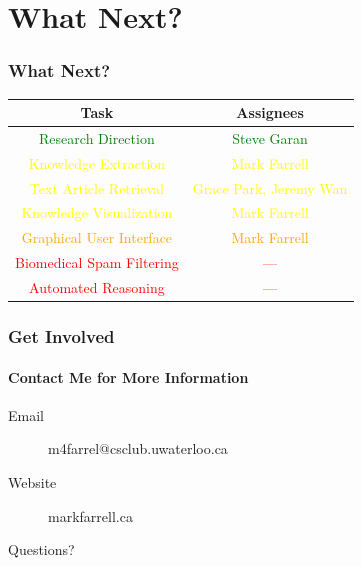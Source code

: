 \documentclass[mathserif, aspectratio=169]{beamer}
\begin{document}
\section{What Next?}

\begin{frame}

\frametitle{What Next?}

\centering

\begin{tabular}{c | c}
Task &  Assignees\\
\hline
\textcolor{green}{Research Direction} & \textcolor{green}{Steve Garan} \\
\textcolor{yellow}{Knowledge Extraction} & \textcolor{yellow}{Mark Farrell} \\
\textcolor{yellow}{Text Article Retrieval} & \textcolor{yellow}{Grace Park, Jeremy Wan} \\
\textcolor{yellow}{Knowledge Visualization} & \textcolor{yellow}{Mark Farrell} \\
\textcolor{orange}{Graphical User Interface} & \textcolor{orange}{Mark Farrell} \\
\textcolor{red}{Biomedical Spam Filtering} & \textcolor{red}{---} \\
\textcolor{red}{Automated Reasoning} & \textcolor{red}{---} \\
\end{tabular}

\end{frame}

\begin{frame}

\frametitle{Get Involved}
\framesubtitle{Contact Me for More Information}

\begin{description}
\item[Email] m4farrel@csclub.uwaterloo.ca
\item[Website] markfarrell.ca
\end{description}

\end{frame}

\begin{frame}[plain]
\centering
Questions?
\end{frame}
\end{document}
